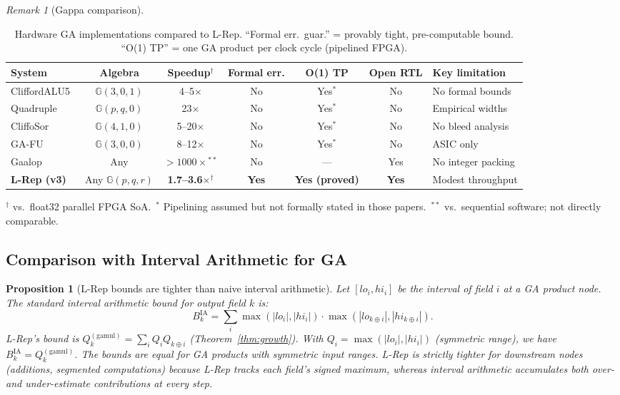 \documentclass[11pt,a4paper]{article}
\theoremstyle{definition}
\theoremstyle{plain}
\newtheorem{proposition}{Proposition}[section]
\theoremstyle{remark}
\newtheorem{remark}{Remark}[section]
\newcommand{\GA}{\mathbb{G}}
\begin{document}
\begin{remark}[Gappa comparison]
\begin{table}[h]
\centering
\caption{Hardware GA implementations compared to L-Rep.
``Formal err.\ guar.'' = provably tight, pre-computable bound.
``O(1) TP'' = one GA product per clock cycle (pipelined FPGA).}
\label{tab:related-hw}
\small
\begin{tabular}{lcccccp{2.5cm}}
\toprule
System & Algebra & Speedup$^\dagger$ & Formal err. & O(1) TP & Open RTL & Key limitation \\
\midrule
CliffordALU5~\cite{cliffordalu5} & $\GA(3,0,1)$ & 4--5$\times$ & No & Yes$^*$ & No & No formal bounds \\
Quadruple~\cite{quadrupleGA} & $\GA(p,q,0)$ & 23$\times$ & No & Yes$^*$ & No & Empirical widths \\
CliffoSor~\cite{cliffosor} & $\GA(4,1,0)$ & 5--20$\times$ & No & Yes$^*$ & No & No bleed analysis \\
GA-FU~\cite{gafu} & $\GA(3,0,0)$ & 8--12$\times$ & No & Yes$^*$ & No & ASIC only \\
Gaalop~\cite{gaalop} & Any & $>1000\times$$^{**}$ & No & --- & Yes & No integer packing \\
\midrule
\textbf{L-Rep (v3)} & Any $\GA(p,q,r)$ & \textbf{1.7--3.6$\times$$^\dagger$} & \textbf{Yes} & \textbf{Yes (proved)} & \textbf{Yes} & Modest throughput \\
\bottomrule
\end{tabular}
\par\smallskip
\small $^\dagger$ vs.\ float32 parallel FPGA SoA.\ $^*$ Pipelining assumed but not formally stated in those papers.\ $^{**}$ vs.\ sequential software; not directly comparable.
\end{table}

\subsection{Comparison with Interval Arithmetic for GA}
\label{sec:ia-compare}

\begin{proposition}[L-Rep bounds are tighter than naive interval arithmetic]
\label{prop:ia-comparison}
Let $[lo_i, hi_i]$ be the interval of field $i$ at a GA product node.
The standard interval arithmetic bound for output field $k$ is:
\[
  B_k^{\mathrm{IA}} = \sum_i \max(|lo_i|, |hi_i|)\cdot\max(|lo_{k\oplus i}|, |hi_{k\oplus i}|).
\]
L-Rep's bound is $Q_k^{(\mathrm{gamul})} = \sum_i Q_i Q_{k\oplus i}$
(Theorem~\ref{thm:growth}).
With $Q_i = \max(|lo_i|, |hi_i|)$ (symmetric range), we have
$B_k^{\mathrm{IA}} = Q_k^{(\mathrm{gamul})}$.
\emph{The bounds are equal for GA products with symmetric input ranges.}
L-Rep is strictly tighter for downstream nodes (additions, segmented
computations) because L-Rep tracks each field's signed maximum,
whereas interval arithmetic accumulates both over- and under-estimate
contributions at every step.
\end{proposition}


\end{remark}
\end{document}

